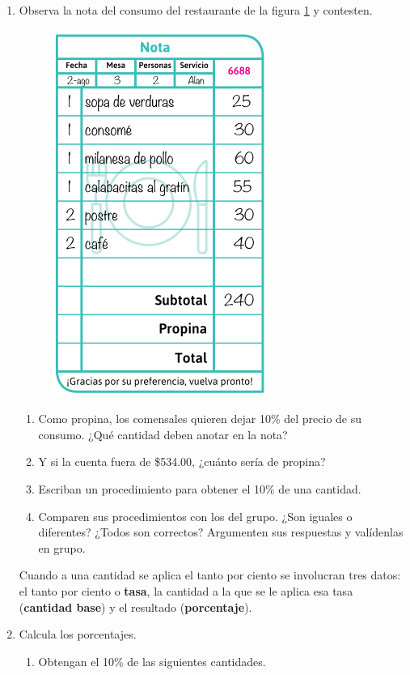 \documentclass[11pt]{book}
\begin{document}
\begin{enumerate}
  \item Observa la nota del consumo del restaurante de la figura \ref{fig:nota_consumo} y
        contesten.
        \begin{figure}[H]
          \centering
          \includegraphics[width=.2\linewidth]{nota_consumo.png}
          \label{fig:nota_consumo}
        \end{figure}
        \begin{enumerate}
          \item Como propina, los comensales quieren dejar 10\% del precio de su consumo. ¿Qué cantidad deben anotar en la nota?
          \item Y si la cuenta fuera de \$534.00, ¿cuánto sería de propina?
          \item Escriban un procedimiento para obtener el 10\% de una cantidad.
          \item Comparen sus procedimientos con los del grupo. ¿Son iguales o diferentes? ¿Todos son correctos? Argumenten sus respuestas y valídenlas en grupo.
        \end{enumerate}
        \begin{boxH}
          Cuando a una cantidad se aplica el tanto por ciento se involucran tres
          datos: el tanto por ciento o \textbf{tasa}, la cantidad a la que se le aplica esa tasa
          (\textbf{cantidad base}) y el resultado (\textbf{porcentaje}).
        \end{boxH}
  \item Calcula los porcentajes.
        \begin{enumerate}
          \item Obtengan el 10\% de las siguientes cantidades.\\
\end{enumerate}
\end{enumerate}
\end{document}
